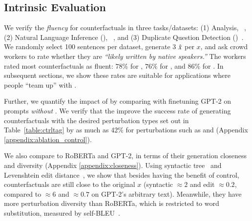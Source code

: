 \subsection{Intrinsic Evaluation}
\label{subsec:intrinsic}



We verify the \emph{fluency} for \sysname counterfactuals in three tasks/datasets: (1) \sst Analysis, \dsst~\cite{socher2013recursive},
(2) Natural Language Inference (\nli), \dnli~\cite{bowman-etal-2015-large}, and 
(3) Duplicate Question Detection (\dqqp)~\cite{wang2018glue}.
We randomly select 100 sentences per dataset, generate 3 $\hat{x}$ per $x$, and ask crowd workers to rate whether they are \emph{``likely written by native speakers.''}
The workers rated most counterfactuals as fluent: $78\%$ for \dsst, $76\%$ for \dqqp, and $86\%$ for \dnli. In subsequent sections, we show these rates are suitable for applications where people ``team up'' with \sysname.

Further, we quantify the impact of \tagstrs by comparing \sysname with finetuning GPT-2 on prompts \emph{without} \tagstrshorts.
We verify that the \tagstrshorts improve the success rate of generating counterfactuals with the desired perturbation types set out in Table~\ref{table:ctrltag} by as much as 42\% for perturbations such as  and 
(Appendix \ref{appendix:ablation_control}).

We also compare \sysname to RoBERTa and GPT-2, in terms of their generation closeness and diversity (Appendix \ref{appendix:closeness}).
Using syntactic tree~\cite{zhang1989simple} and Levenshtein edit distance~\cite{levenshtein1966binary}, we show that besides having the benefit of control, \sysname counterfactuals are still close to the original $x$ (syntactic ${\approx}2$ and edit ${\approx}0.2$, compared to ${\approx}6$ and ${\approx}0.7$ on GPT-2's arbitrary text).
Meanwhile, they have more perturbation diversity than RoBERTa, which is restricted to word substitution, measured by self-BLEU~\cite{zhu2018texygen}.
